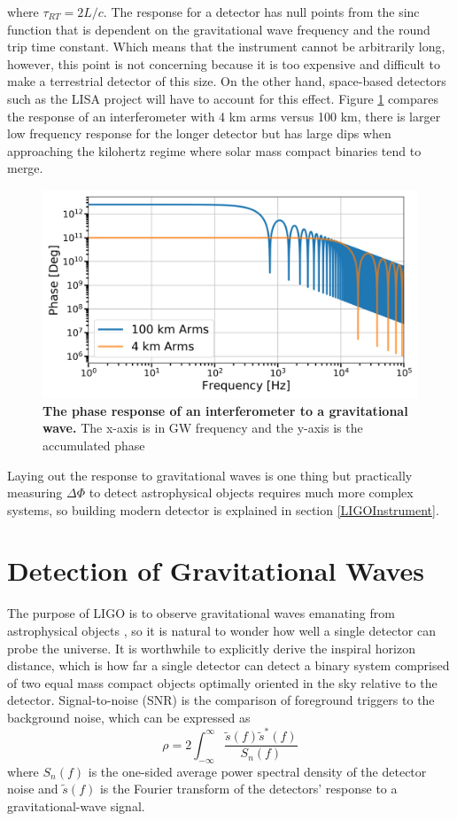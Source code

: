 	where $\tau_{RT} = 2L/c$.  The response for a detector has null points from the sinc function that is dependent on the gravitational wave frequency and the round trip time constant.  Which means that the instrument cannot be arbitrarily long, however, this point is not concerning because it is too expensive and difficult to make a terrestrial detector of this size.  On the other hand, space-based detectors such as the LISA project will have to account for this effect.  Figure \ref{fig:sincgw} compares the response of an interferometer with 4 km arms versus 100 km, there is larger low frequency response for the longer detector but has large dips when approaching the kilohertz regime where solar mass compact binaries tend to merge.
	
	\begin{figure}[ht]
		\centering
		\includegraphics[width=.7 \textwidth]{../Figures/SincGW.png}
		\caption[The phase response of an interferometer to a gravitational wave.]  
		{\textbf{The phase response of an interferometer to a gravitational wave.} The x-axis is in GW frequency and the y-axis is the accumulated phase}
		\label{fig:sincgw}
	\end{figure}
	Laying out the response to gravitational waves is one thing but practically measuring $\Delta \Phi$ to detect astrophysical objects requires much more complex systems, so building modern detector is explained in section \ref{LIGOInstrument}.

	\section{Detection of Gravitational Waves}\label{detectgw}
	The purpose of LIGO is to observe gravitational waves emanating from astrophysical objects \cite{NSFproposal}, so it is natural to wonder how well a single detector can probe the universe.  It is worthwhile to explicitly derive the inspiral horizon distance, which is how far a single detector can detect a binary system comprised of two equal mass compact objects optimally oriented in the sky relative to the detector.  Signal-to-noise (SNR) is the comparison of foreground triggers to the background noise, which can be expressed as
	\begin{equation}\label{SNR}
	\rho = 2 \int_{-\infty}^{\infty} \frac{ \tilde{s}(f) \tilde{s}^*(f) }{S_n(f)}
	\end{equation}
	where ${S_n(f)}$ is the one-sided average power spectral density of the detector noise and $\tilde{s}(f)$ is the Fourier transform of the detectors' response to a gravitational-wave signal.
	
